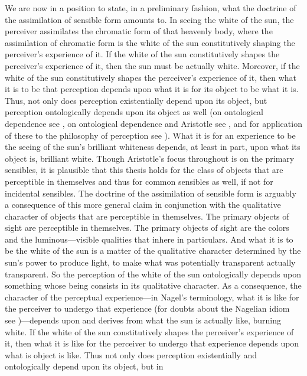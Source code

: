We are now in a position to state, in a preliminary fashion, what the doctrine of the assimilation of sensible form amounts to. In seeing the white of the sun, the perceiver assimilates the chromatic form of that heavenly body, where the assimilation of chromatic form is the white of the sun constitutively shaping the perceiver's experience of it. If the white of the sun constitutively shapes the perceiver's experience of it, then the sun must be actually white. Moreover, if the white of the sun constitutively shapes the perceiver's experience of it, then what it is to be that perception depends upon what it is for its object to be what it is. Thus, not only does perception existentially depend upon its object, but perception ontologically depends upon its object as well (on ontological dependence see \citealt{Fine:1995ls}, on ontological dependence and Aristotle see \citealt{Peramatzis:2011aa}, and for application of these to the philosophy of perception see \citealt{Kalderon:2012fk}). What it is for an experience to be the seeing of the sun's brilliant whiteness depends, at least in part, upon what its object is, brilliant white. Though Aristotle's focus throughout is on the primary sensibles, it is plausible that this thesis holds for the class of objects that are perceptible in themselves and thus for common sensibles as well, if not for incidental sensibles. The doctrine of the assimilation of sensible form is arguably a consequence of this more general claim in conjunction with the qualitative character of objects that are perceptible in themselves. The primary objects of sight are perceptible in themselves. The primary objects of sight are the colors and the luminous---visible qualities that inhere in particulars. And what it is to be the white of the sun is a matter of the qualitative character determined by the sun's power to produce light, to make what was potentially transparent actually transparent. So the perception of the white of the sun ontologically depends upon something whose being consists in its qualitative character.  As a consequence, the character of the perceptual experience---in Nagel's \citeyearpar{Nagel:1979fk} terminology, what it is like for the perceiver to undergo that experience (for doubts about the Nagelian idiom see \citealt{Snowdon:2010ap})---depends upon and derives from what the sun is actually like, burning white. If the white of the sun constitutively shapes the perceiver's experience of it, then what it is like for the perceiver to undergo that experience depends upon what is object is like. Thus not only does perception existentially and ontologically depend upon its object, but in 